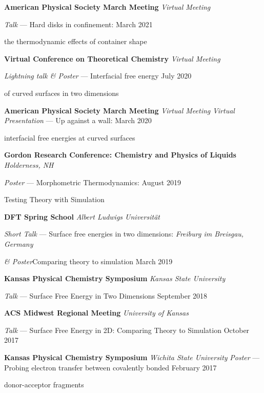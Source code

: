 {\bf American Physical Society March Meeting} \hfill \textit{Virtual Meeting}

\textit{Talk} --- Hard disks in confinement:  \hfill March 2021

\qquad\qquad the thermodynamic effects of container shape

\vspace{\y}
{\bf Virtual Conference on Theoretical Chemistry} \hfill \textit{Virtual Meeting}

\textit{Lightning talk \& Poster} --- Interfacial free energy \hfill July 2020

\qquad\qquad of curved surfaces in two dimensions

\vspace{\y}
{\bf American Physical Society March Meeting} \hfill \textit{Virtual Meeting}
\linebreak
\textit{Virtual Presentation} --- Up against a wall:  \hfill March 2020

\qquad\qquad interfacial free energies at curved surfaces

\vspace{\y}
{\bf Gordon Research Conference: Chemistry and Physics of Liquids} \hfill \textit{Holderness, NH}

\textit{Poster} --- Morphometric Thermodynamics: \hfill August 2019

\qquad\qquad Testing Theory with Simulation

\vspace{\y}
{\bf DFT Spring School} \hfill \textit{Albert Ludwigs Universit{\"a}t}

\textit{Short Talk} --- Surface free energies in two dimensions:
\hfill \textit{Freiburg im Breisgau, Germany}

\quad \textit{\& Poster}\qquad Comparing theory to simulation \hfill March 2019

\vspace{\y}
{\bf Kansas Physical Chemistry Symposium} \hfill \textit{Kansas State University}

\textit{Talk} --- Surface Free Energy in Two Dimensions \hfill September 2018

\vspace{\y}
{\bf ACS Midwest Regional Meeting} \hfill \textit{University of Kansas}

\textit{Talk} --- Surface Free Energy in 2D: Comparing Theory to Simulation \hfill October 2017

\vspace{\y}
{\bf Kansas Physical Chemistry Symposium} \hfill \textit{Wichita State University}
\linebreak
\textit{Poster} --- Probing electron transfer between covalently bonded \hfill February 2017

\qquad\qquad\quad donor-acceptor fragments